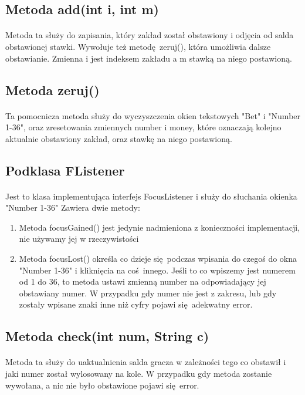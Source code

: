 \documentclass[11pt,a4paper]{article}
\begin{document}
\subsection{Metoda add(int i, int m)}
\paragraph{}
Metoda ta służy do zapisania, który zakład został obstawiony i odjęcia od salda obstawionej stawki. Wywołuje też metodę zeruj(), która umożliwia dalsze obstawianie. Zmienna i jest indeksem zakładu a m stawką na niego postawioną.
\subsection{Metoda zeruj()}
\paragraph{}
Ta pomocnicza metoda służy do wyczyszczenia okien tekstowych "Bet" i "Number 1-36", oraz zresetowania zmiennych number i money, które oznaczają kolejno aktualnie obstawiony zakład, oraz stawkę na niego postawioną.
\subsection{Podklasa FListener}
\paragraph{}
Jest to klasa implementująca interfejs FocusListener i służy do słuchania okienka "Number 1-36"
Zawiera dwie metody:
\begin{enumerate}
  \item Metoda focusGained() jest jedynie nadmieniona z konieczności implementacji, nie używamy jej w rzeczywistości
  \item Metoda focusLost() określa co dzieje się podczas wpisania do czegoś do okna "Number 1-36" i kliknięcia na coś innego. Jeśli to co wpiszemy jest numerem od 1 do 36, to metoda ustawi zmienną number na odpowiadający jej obstawiany numer. W przypadku gdy numer nie jest z zakresu, lub gdy zostały wpisane znaki inne niż cyfry pojawi się adekwatny error.
\end{enumerate}
\subsection{Metoda check(int num, String c)}
\paragraph{}
Metoda ta służy do uaktualnienia salda gracza w zależności tego co obstawił i jaki numer został wylosowany na kole. W przypadku gdy metoda zostanie wywołana, a nic nie było obstawione pojawi się error.
\end{document}
